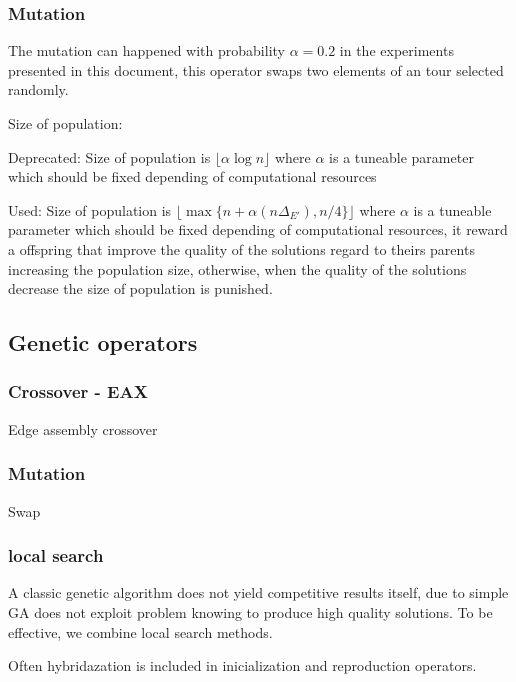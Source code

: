 \subsubsection*{Mutation}

The mutation can happened with probability $\alpha = 0.2$ in the experiments presented in this document, this operator swaps two elements of an tour selected randomly.




Size of population:


Deprecated:
Size of population is $\lfloor \alpha \log n \rfloor$ where $\alpha$ is a tuneable parameter which should be fixed depending of computational resources 

Used:
Size of population is $\lfloor \max \{ n+\alpha(n\Delta_{E'}), n/4 \} \rfloor$ where $\alpha$ is a tuneable parameter which should be fixed depending of computational resources, it reward a offspring that improve the quality of the solutions regard to theirs parents increasing the population size, otherwise, when the quality of the solutions decrease the size of population is punished.


\subsection{Genetic operators}

\subsubsection{Crossover - EAX}

Edge assembly crossover

\subsubsection*{Mutation}

Swap

\subsubsection*{local search}


A classic genetic algorithm does not yield competitive results itself, due to simple GA does not exploit problem knowing to produce high quality solutions. To be effective, we combine local search methods.


Often hybridazation is included in inicialization and reproduction operators.

